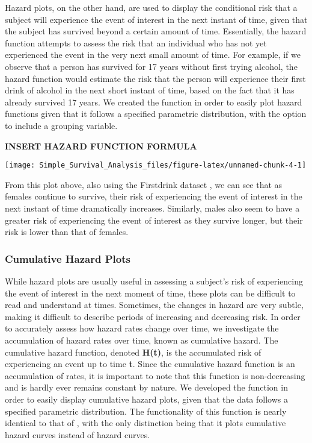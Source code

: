 Hazard plots, on the other hand, are used to display the conditional
risk that a subject will experience the event of interest in the next
instant of time, given that the subject has survived beyond a certain
amount of time. Essentially, the hazard function attempts to assess the
risk that an individual who has not yet experienced the event in the
very next small amount of time. For example, if we observe that a person
has survived for 17 years without first trying alcohol, the hazard
function would estimate the risk that the person will experience their
first drink of alcohol in the next short instant of time, based on the
fact that it has already survived 17 years. We created the
 function in order to easily plot hazard functions given
that it follows a specified parametric distribution, with the option to
include a grouping variable.

\textbf{INSERT HAZARD FUNCTION FORMULA}

\begin{Schunk}

\texttt{[image: Simple\_Survival\_Analysis\_files/figure-latex/unnamed-chunk-4-1]} \end{Schunk}

From this plot above, also using the Firstdrink dataset , we can see
that as females continue to survive, their risk of experiencing the
event of interest in the next instant of time dramatically increases.
Similarly, males also seem to have a greater risk of experiencing the
event of interest as they survive longer, but their risk is lower than
that of females.

\hypertarget{cumulative-hazard-plots}{%
\subsubsection{Cumulative Hazard Plots}\label{cumulative-hazard-plots}}

While hazard plots are usually useful in assessing a subject's risk of
experiencing the event of interest in the next moment of time, these
plots can be difficult to read and understand at times. Sometimes, the
changes in hazard are very subtle, making it difficult to describe
periods of increasing and decreasing risk. In order to accurately assess
how hazard rates change over time, we investigate the accumulation of
hazard rates over time, known as cumulative hazard. The cumulative
hazard function, denoted \textbf{H(t)}, is the accumulated risk of
experiencing an event up to time \textbf{t}. Since the cumulative hazard
function is an accumulation of rates, it is important to note that this
function is non-decreasing and is hardly ever remains constant by
nature. We developed the function  in order to easily
display cumulative hazard plots, given that the data follows a specified
parametric distribution. The functionality of this function is nearly
identical to that of , with the only distinction being
that it plots cumulative hazard curves instead of hazard curves.

